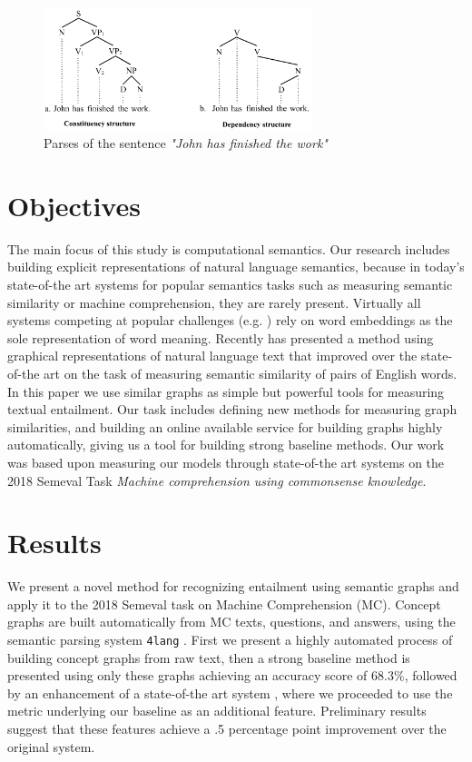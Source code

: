 \begin{figure}[h!]
	\centering
	\includegraphics[width=0.7\textwidth]{figures/Johnhasfinishedthework}
	\caption{Parses of the sentence \textit{"John has finished the work"} \cite{parsers}}
	\label{fig:johnfinished}
\end{figure}
\section{Objectives}
The main focus of this study is computational semantics. Our research includes building explicit representations of natural language semantics, because in today's state-of-the art systems for popular semantics tasks such as measuring semantic similarity or machine comprehension, they are rarely present. Virtually all systems
competing at popular challenges (e.g. \cite{Cer:2017,Collados:2017}) rely on word embeddings as the sole representation of word meaning. Recently \cite{Recski:2016c} has presented a method using graphical representations of natural language text that improved over the state-of-the art on the task of
measuring semantic similarity of pairs of English words. In this paper
we use similar graphs as simple but powerful tools for measuring textual
entailment. Our task includes defining new methods for measuring graph similarities, and building an online available service for building graphs highly automatically, giving us a tool for building strong baseline methods. Our work was based upon measuring our models through state-of-the art systems on the 2018 Semeval Task \textit{Machine comprehension using commonsense knowledge}.

\section{Results}
We present a novel method for recognizing entailment using semantic
graphs and apply it to the 2018 Semeval task on Machine
Comprehension (MC).
Concept graphs are built automatically from MC texts, questions, and answers,
using the semantic parsing system \texttt{4lang} \cite{Recski:2016d}.
First we present a highly automated process of building concept graphs from raw text, then a strong baseline method is presented using only these graphs achieving an accuracy score of $68.3\%$,
followed by an enhancement of a state-of-the art system
\cite{Wang:2018}, where we proceeded to use the metric underlying our baseline as an additional feature. Preliminary results suggest that these features achieve a .5 percentage point improvement over the original system.

